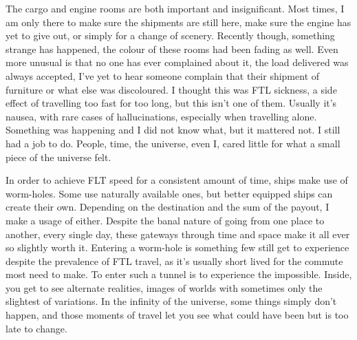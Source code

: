 The cargo and engine rooms are both important and insignificant. Most times, I am only there to make sure the shipments are still here, make sure the engine has yet to give out, or simply for a change of scenery. Recently though, something strange has happened, the colour of these rooms had been fading as well. Even more unusual is that no one has ever complained about it, the load delivered was always accepted, I've yet to hear someone complain that their shipment of furniture or what else was discoloured. I thought this was FTL sickness, a side effect of travelling too fast for too long, but this isn't one of them. Usually it's nausea, with rare cases of hallucinations, especially when travelling alone. Something was happening and I did not know what, but it mattered not. I still had a job to do. People, time, the universe, even I, cared little for what a small piece of the universe felt.

In order to achieve FLT speed for a consistent amount of time, ships make use of worm-holes. Some use naturally available ones, but better equipped ships can create their own. Depending on the destination and the sum of the payout, I make a usage of either. Despite the banal nature of going from one place to another, every single day, these gateways through time and space make it all ever so slightly worth it. Entering a worm-hole is something few still get to experience despite the prevalence of FTL travel, as it's usually short lived for the commute most need to make. To enter such a tunnel is to experience the impossible. Inside, you get to see alternate realities, images of worlds with sometimes only the slightest of variations. In the infinity of the universe, some things simply don't happen, and those moments of travel let you see what could have been but is too late to change.

